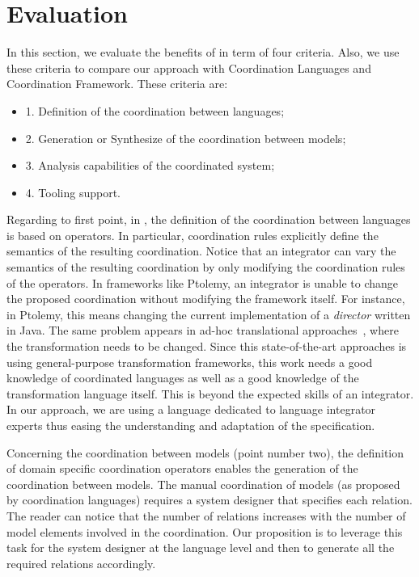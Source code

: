 \section{Evaluation}
\label{sec:evaluation}
In this section, we evaluate the benefits of  \bcool in term of four criteria. Also, we use these criteria to compare our approach with Coordination Languages and Coordination Framework. These criteria are:
	\begin{itemize}
		\item 1. Definition of the coordination between languages;
		\item 2. Generation or Synthesize of the coordination between models; 
		\item 3. Analysis capabilities of the coordinated system;
		\item 4. Tooling support.
	\end{itemize}  

Regarding to first point, in \bcool, the definition of the coordination between languages is based on operators. In particular, coordination rules explicitly define the semantics of the resulting coordination. Notice that an integrator can vary the semantics of the resulting coordination by only modifying the coordination rules of the operators. In frameworks like Ptolemy, an integrator is unable to change the proposed coordination without modifying the framework itself. For instance, in Ptolemy, this means changing the current implementation of a \emph{director} written in Java. The same problem appears in ad-hoc translational approaches~\cite{dinatale}, where the transformation needs to be changed. Since this state-of-the-art approaches is using general-purpose transformation frameworks, this work needs a good knowledge of coordinated languages as well as a good knowledge of the transformation language itself. This is beyond the expected skills of an integrator. In our approach, we are using a language dedicated to language integrator experts thus easing the understanding and adaptation of the \bcool specification. 

Concerning the coordination between models (point number two), the definition of domain specific coordination operators enables the generation of the coordination between models. The manual coordination of models (as proposed by coordination languages) requires a system designer that specifies each relation. The reader can notice that the number of relations increases with the number of model elements involved in the coordination. Our proposition is to leverage this task for the system designer at the language level and then to generate all the required relations accordingly.

